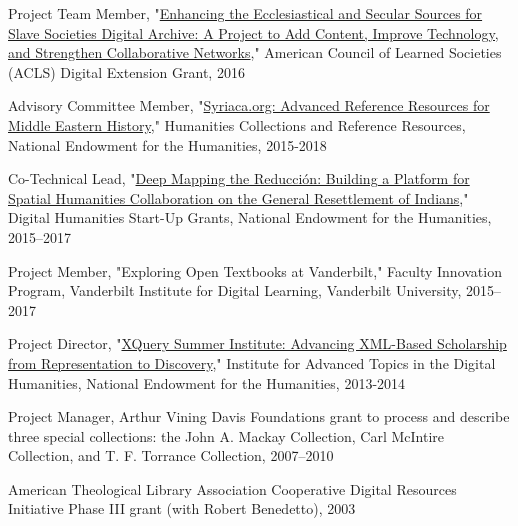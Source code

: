 \documentclass[]{res} %
\begin{document}
\begin{resume}
\begin{hangparas}{.25in}{1}Project Team Member, "\href{http://www.acls.org/research/fellow.aspx?cid=f125fd4b-41a1-e211-b90d-000c29a3451a}{Enhancing the Ecclesiastical and Secular Sources for Slave Societies Digital Archive: A Project to Add Content, Improve Technology, and Strengthen Collaborative Networks}," American Council of Learned Societies (ACLS) Digital Extension Grant, 2016\end{hangparas}

\begin{hangparas}{.25in}{1}Advisory Committee Member, "\href{https://securegrants.neh.gov/PublicQuery/main.aspx?f=1\&gn=PW-228209-15}{Syriaca.org: Advanced Reference Resources for Middle Eastern History}," Humanities Collections and Reference Resources, National Endowment for the Humanities, 2015-2018\end{hangparas}  
\begin{hangparas}{.25in}{1}Co-Technical Lead, "\href{https://securegrants.neh.gov/PublicQuery/main.aspx?f=1\&gn=HD-229071-15}{Deep Mapping the Reducción: Building a Platform for Spatial Humanities Collaboration on the General Resettlement of Indians}," Digital Humanities Start-Up Grants, National Endowment for the Humanities, 2015–2017\end{hangparas} 

\begin{hangparas}{.25in}{1}Project Member, "Exploring Open Textbooks at Vanderbilt," Faculty Innovation Program, Vanderbilt Institute for Digital Learning, Vanderbilt University, 2015–2017\end{hangparas}

\begin{hangparas}{.25in}{1}Project Director, "\href{https://securegrants.neh.gov/publicquery/main.aspx?f=1\&gn=HT-50080-13}{XQuery Summer Institute: Advancing XML-Based Scholarship from Representation to Discovery}," Institute for Advanced Topics in the Digital Humanities, National Endowment for the Humanities, 2013-2014\end{hangparas}

\begin{hangparas}{.25in}{1}Project Manager, Arthur Vining Davis Foundations grant to process and describe three special collections: the John A. Mackay Collection, Carl McIntire Collection, and T. F. Torrance Collection, 2007–2010\end{hangparas}

\begin{hangparas}{.25in}{1}American Theological Library Association Cooperative Digital Resources Initiative Phase III grant (with Robert Benedetto), 2003\end{hangparas}


\end{resume}
\end{document}
